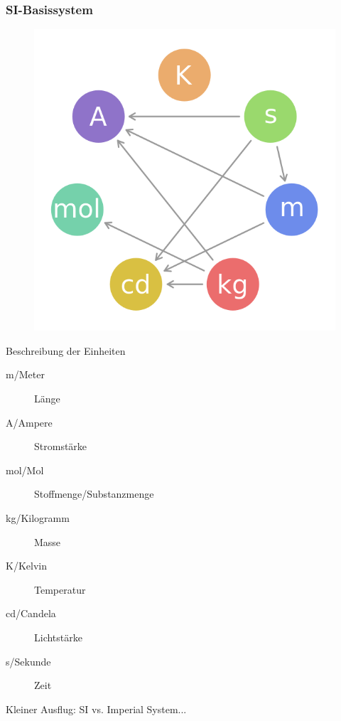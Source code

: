 \begin{frame}
  \frametitle{SI-Basissystem}

  \begin{center}
    \begin{figure}
      \includegraphics[height=0.75\textheight]{e01/SI_base_unit.png}
    \end{figure}
  \end{center}

\end{frame}

\begin{frame}
  \begin{block}{Beschreibung der Einheiten}
    \begin{description}
      \item[m/Meter] Länge
      \item[A/Ampere] Stromstärke
      \item[mol/Mol] Stoffmenge/Substanzmenge
      \item[kg/Kilogramm] Masse
      \item[K/Kelvin] Temperatur
      \item[cd/Candela] Lichtstärke
      \item[s/Sekunde] Zeit
    \end{description}
  \end{block}

  \pause
  Kleiner Ausflug: SI vs. Imperial System...
\end{frame}

